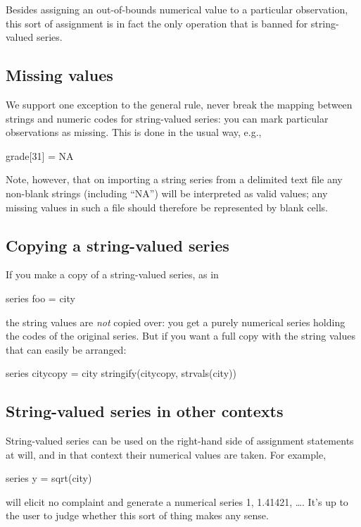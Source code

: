 Besides assigning an out-of-bounds numerical value to a particular
observation, this sort of assignment is in fact the only operation
that is banned for string-valued series.

\subsection{Missing values}

We support one exception to the general rule, never break the mapping
between strings and numeric codes for string-valued series: you can
mark particular observations as missing. This is done in the usual
way, e.g.,
\begin{code}
grade[31] = NA
\end{code}
Note, however, that on importing a string series from a delimited text
file any non-blank strings (including ``NA'') will be interpreted as
valid values; any missing values in such a file should therefore be
represented by blank cells.

\subsection{Copying a string-valued series}

If you make a copy of a string-valued series, as in
\begin{code}
series foo = city
\end{code}
the string values are \textit{not} copied over: you get a purely
numerical series holding the codes of the original series. But if you
want a full copy with the string values that can easily be arranged:
\begin{code}
series citycopy = city
stringify(citycopy, strvals(city))
\end{code}

\subsection{String-valued series in other contexts}

String-valued series can be used on the right-hand side of assignment
statements at will, and in that context their numerical values are
taken. For example,
%
\begin{code}
series y = sqrt(city)
\end{code}
%
will elicit no complaint and generate a numerical series 1, 1.41421,
\dots{}. It's up to the user to judge whether this sort of thing
makes any sense.

